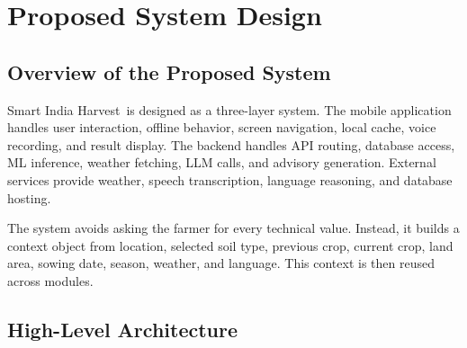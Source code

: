 \documentclass[12pt,a4paper]{report}
\newcommand{\ProjectName}{Smart India Harvest}
\begin{document}
\singlespacing

\chapter{Proposed System Design}
\doublespacing

\section{Overview of the Proposed System}

\ProjectName\ is designed as a three-layer system. The mobile application handles user interaction, offline behavior, screen navigation, local cache, voice recording, and result display. The backend handles API routing, database access, ML inference, weather fetching, LLM calls, and advisory generation. External services provide weather, speech transcription, language reasoning, and database hosting.

The system avoids asking the farmer for every technical value. Instead, it builds a context object from location, selected soil type, previous crop, current crop, land area, sowing date, season, weather, and language. This context is then reused across modules.

\section{High-Level Architecture}
\end{document}
